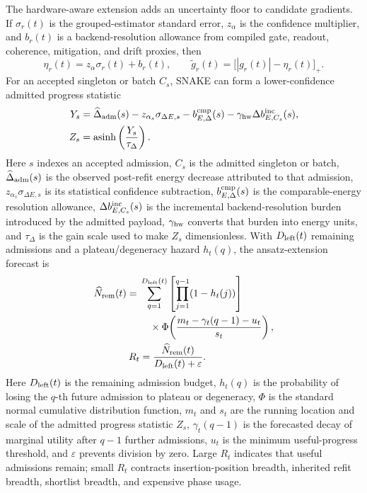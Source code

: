 \documentclass[
  reprint,
  amsmath,
  amssymb,
  aps,
  pra,
  nofootinbib,
  superscriptaddress,
  floatfix
]{revtex4-2}
\newcommand{\eps}{\varepsilon}
\begin{document}
The hardware-aware extension adds an uncertainty floor to candidate gradients.  If $\sigma_r(t)$ is the grouped-estimator standard error, \(z_\alpha\) is the confidence multiplier, and $b_r(t)$ is a backend-resolution allowance from compiled gate, readout, coherence, mitigation, and drift proxies, then
\begin{equation}
\eta_r(t)=z_\alpha\sigma_r(t)+b_r(t),
\qquad
\widetilde g_r(t)=\bigl[|g_r(t)|-\eta_r(t)\bigr]_+ .
\label{eq:appendix_resolved_gradient}
\end{equation}
For an accepted singleton or batch $C_s$, SNAKE can form a lower-confidence admitted progress statistic
\begin{equation}
\begin{aligned}
Y_s&=
\widehat\Delta_{\rm adm}(s)
-z_{\alpha_s}\sigma_{\Delta E,s}
-b_{E,\Delta}^{\rm cmp}(s)
-\gamma_{\rm hw}\Delta b_{E,C_s}^{\rm inc}(s),
\\
Z_s&=\operatorname{asinh}\left(\frac{Y_s}{\tau_\Delta}\right).
\end{aligned}
\label{eq:appendix_net_admitted_gain}
\end{equation}
Here \(s\) indexes an accepted admission, \(C_s\) is the admitted singleton or batch, \(\widehat\Delta_{\rm adm}(s)\) is the observed post-refit energy decrease attributed to that admission, \(z_{\alpha_s}\sigma_{\Delta E,s}\) is its statistical confidence subtraction, \(b_{E,\Delta}^{\rm cmp}(s)\) is the comparable-energy resolution allowance, \(\Delta b_{E,C_s}^{\rm inc}(s)\) is the incremental backend-resolution burden introduced by the admitted payload, \(\gamma_{\rm hw}\) converts that burden into energy units, and \(\tau_\Delta\) is the gain scale used to make \(Z_s\) dimensionless.
With $D_{\rm left}(t)$ remaining admissions and a plateau/degeneracy hazard $h_t(q)$, the ansatz-extension forecast is
\begin{equation}
\begin{aligned}
\widehat N_{\rm rem}(t)
={}&
\sum_{q=1}^{D_{\rm left}(t)}
\left[\prod_{j=1}^{q-1}(1-h_t(j))\right]
\\
&\quad\times
\Phi\!\left(\frac{m_t-\gamma_t(q-1)-u_t}{s_t}\right),
\\
R_t&=\frac{\widehat N_{\rm rem}(t)}{D_{\rm left}(t)+\eps} .
\end{aligned}
\label{eq:expected_utility_left}
\end{equation}
Here \(D_{\rm left}(t)\) is the remaining admission budget, \(h_t(q)\) is the probability of losing the \(q\)-th future admission to plateau or degeneracy, \(\Phi\) is the standard normal cumulative distribution function, \(m_t\) and \(s_t\) are the running location and scale of the admitted progress statistic \(Z_s\), \(\gamma_t(q-1)\) is the forecasted decay of marginal utility after \(q-1\) further admissions, \(u_t\) is the minimum useful-progress threshold, and \(\eps\) prevents division by zero. Large $R_t$ indicates that useful admissions remain; small $R_t$ contracts insertion-position breadth, inherited refit breadth, shortlist breadth, and expensive phase usage.
\end{document}
